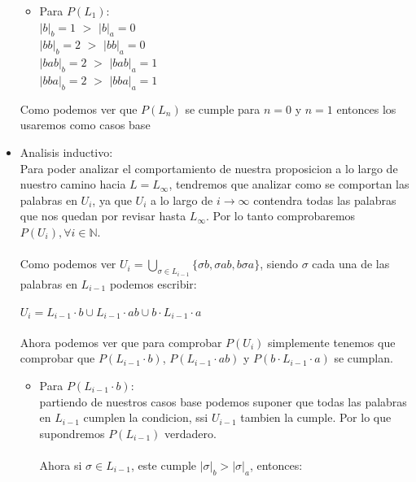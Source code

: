 \documentclass[spanish, draft]{article}
\begin{document}
\begin{itemize}
\begin{itemize}
                \item Para $P(L_1):$\\
                    $|b|_b = 1$ $>$ $|b|_a = 0$\\
                    $|bb|_b = 2$ $>$ $|bb|_a = 0$\\
                    $|bab|_b = 2$ $>$ $|bab|_a = 1$\\
                    $|bba|_b = 2$ $>$ $|bba|_a = 1$
            \end{itemize}
            Como podemos ver que $P(L_n)$ se cumple para $n = 0$ y $n = 1$ entonces los usaremos como casos base
    \item Analisis inductivo:\\
            Para poder analizar el comportamiento de nuestra proposicion a lo largo de nuestro camino hacia $L = L_\infty$, tendremos que analizar como se comportan las palabras en $U_i$, ya que $U_i$ a lo largo de $i \to \infty$ contendra todas las palabras que nos quedan por revisar hasta $L_\infty$.
            Por lo tanto comprobaremos $P(U_i), \forall i \in \mathbb{N}$.\\
            \\
            Como podemos ver $U_i = \bigcup\limits_{\sigma \in L_{i-1}} \{\sigma b, \sigma ab, b\sigma a\}$, siendo $\sigma$ cada una de las palabras en $L_{i-1}$ podemos escribir:\\
            \\
            $U_i = L_{i-1} \cdot b \cup L_{i-1} \cdot ab \cup b \cdot L_{i-1} \cdot a$\\
            \\
            Ahora podemos ver que para comprobar $P(U_i)$ simplemente tenemos que comprobar que $P(L_{i-1} \cdot b)$, $P(L_{i-1} \cdot ab)$ y $P(b \cdot L_{i-1} \cdot a)$ se cumplan.
            \begin{itemize}
                \item Para $P(L_{i-1} \cdot b)$:\\
                        partiendo de nuestros casos base podemos suponer que todas las palabras en $L_{i-1}$ cumplen la condicion, ssi $U_{i-1}$ tambien la cumple.
                        Por lo que supondremos $P(L_{i-1})$ verdadero.\\
                        \\
                        Ahora si $\sigma \in L_{i-1}$, este cumple $|\sigma|_b > |\sigma|_a$, entonces:\\
                        \\

\end{itemize}
\end{itemize}
\end{document}
